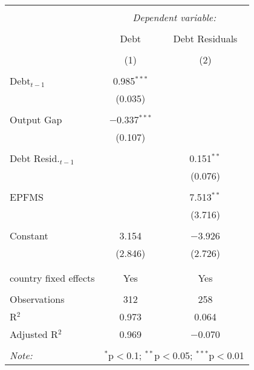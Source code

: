 
\begingroup 
\footnotesize 
\begin{tabular}{@{\extracolsep{5pt}}lcc} 
\\[-1.8ex]\hline 
\hline \\[-1.8ex] 
 & \multicolumn{2}{c}{\textit{Dependent variable:}} \\ 
\cline{2-3} 
\\[-1.8ex] & Debt & Debt Residuals \\ 
\\[-1.8ex] & (1) & (2)\\ 
\hline \\[-1.8ex] 
 Debt$_{t-1}$ & 0.985$^{***}$ &  \\ 
  & (0.035) &  \\ 
  & & \\ 
 Output Gap & $-$0.337$^{***}$ &  \\ 
  & (0.107) &  \\ 
  & & \\ 
 Debt Resid.$_{t-1}$ &  & 0.151$^{**}$ \\ 
  &  & (0.076) \\ 
  & & \\ 
 EPFMS &  & 7.513$^{**}$ \\ 
  &  & (3.716) \\ 
  & & \\ 
 Constant & 3.154 & $-$3.926 \\ 
  & (2.846) & (2.726) \\ 
  & & \\ 
\hline \\[-1.8ex] 
country fixed effects & Yes & Yes \\ 
\hline \\[-1.8ex] 
Observations & 312 & 258 \\ 
R$^{2}$ & 0.973 & 0.064 \\ 
Adjusted R$^{2}$ & 0.969 & $-$0.070 \\ 
\hline 
\hline \\[-1.8ex] 
\textit{Note:}  & \multicolumn{2}{r}{$^{*}$p$<$0.1; $^{**}$p$<$0.05; $^{***}$p$<$0.01} \\ 
\end{tabular} 
\endgroup 
